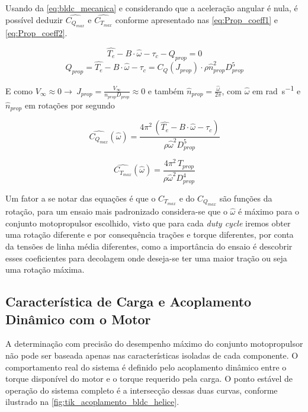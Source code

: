 Usando da \autoref{eq:bldc_mecanica} e considerando que a aceleração angular é nula, é possível deduzir $\hat{C_{Q_{max}}}$ e  $\hat{C_{T_{max}}}$ conforme apresentado nas \autoref{eq:Prop_coeff1} e \autoref{eq:Prop_coeff2}.

\[
\hat{T_e} - B \cdot \hat{\omega} - \tau_c - Q_{prop} = 0
\]
\[
Q_{prop} = \hat{T_e} - B \cdot \hat{\omega} - \tau_c = C_Q (J_{prop}) \cdot \rho \hat{n}^2_{prop} {D}^5_{prop}
\]

E como $V_{\infty} \approx 0 \rightarrow \ J_{prop} = \frac{V_{\infty}}{n_{prop}D_{prop}} \approx 0$ e também $\hat{n}_{prop} = \frac{\hat{\omega}}{2\pi}$, com $\hat{\omega}$ em \si{\radian\per\second} e $\hat{n}_{prop}$ em rotações por segundo

\begin{equation}
    \hat{C_{Q_{max}}} (\hat{\omega})= \frac{4\pi^2 \, (\hat{T_e}- B\cdot \hat{\omega} - \tau_c) }{\rho \hat{\omega}^2D_{prop}^5}
    \label{eq:Prop_coeff1}
\end{equation}

\begin{equation}
    \hat{C_{T_{max}}} (\hat{\omega}) = \frac{4\pi^2 \, T_{prop}}{\rho \hat{\omega}^2D_{prop}^4}
    \label{eq:Prop_coeff2}
\end{equation}

Um fator a se notar das equações é que o $C_{T_{max}}$ e do $C_{Q_{max}}$ são funções da rotação, para um ensaio mais padronizado considera-se que o $\hat{\omega}$ é máximo para o conjunto motopropulsor escolhido, visto que para cada \textit{duty cycle} iremos obter uma rotação diferente e por consequência trações e torque diferentes, por conta da tensões de linha média diferentes, como a importância do ensaio é descobrir esses coeficientes para decolagem onde deseja-se ter uma maior tração ou seja uma rotação máxima.

\subsection{Característica de Carga e Acoplamento Dinâmico com o Motor}
\label{sec:helice_acoplamento}


A determinação com precisão do desempenho máximo do conjunto motopropulsor não pode ser baseada apenas nas características isoladas de cada componente. O comportamento real do sistema é definido pelo acoplamento dinâmico entre o torque disponível do motor e o torque requerido pela carga. O ponto estável de operação do sistema completo é a intersecção dessas duas curvas, conforme ilustrado na \autoref{fig:tik_acoplamento_bldc_helice}.

